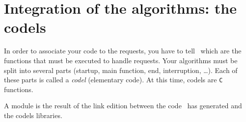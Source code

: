 
\section{Integration of the algorithms: the codels}
\label{sec|module|codels}

In order to associate your code to the requests, you have to tell \GenoM\
which are the  functions that must be  executed to  handle requests. Your
algorithms must be split into several parts (startup, main function, end,
interruption, \ldots).   Each  of  these   parts  is called  a   \emph{codel}
(elementary code). At this time, codels are \texttt{C} functions.

A module is the result of  the link edition between  the code \GenoM\ has
generated and the codels libraries.
